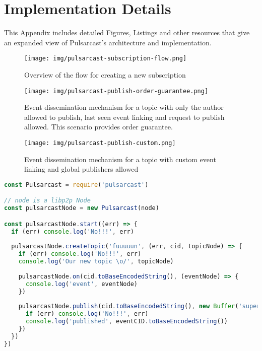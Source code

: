 
\section{Implementation Details}
\label{section:appendix}

This Appendix includes detailed Figures, Listings and other resources that give
an expanded view of Pulsarcast's architecture and implementation.

\begin{figure}
  \centering
  \texttt{[image: img/pulsarcast-subscription-flow.png]}
  \caption{Overview of the flow for creating a new subscription}
  \label{fig:pulsarcast-subscription-flow}
\end{figure}

\begin{figure}
  \centering
  \texttt{[image: img/pulsarcast-publish-order-guarantee.png]}
  \caption{Event dissemination mechanism for a topic with only the author allowed to publish, last seen event linking and request to publish allowed. This scenario provides order guarantee.}
  \label{fig:pulsarcast-publish-order-guarantee}
\end{figure}

\begin{figure}
  \centering
  \texttt{[image: img/pulsarcast-publish-custom.png]}
  \caption{Event dissemination mechanism for a topic with custom event linking and global publishers allowed}
  \label{fig:pulsarcast-publish-custom}
\end{figure}

\begin{lstlisting}[language=JavaScript, float=h, caption={Usage example of our Pulsarcast module},label={pulsarcast-usage-example}]
const Pulsarcast = require('pulsarcast')

// node is a libp2p Node
const pulsarcastNode = new Pulsarcast(node)

const pulsarcastNode.start((err) => {
  if (err) console.log('No!!!', err)
  
  pulsarcastNode.createTopic('fuuuuun', (err, cid, topicNode) => {
    if (err) console.log('No!!!', err)
    console.log('Our new topic \o/', topicNode)
    
    pulsarcastNode.on(cid.toBaseEncodedString(), (eventNode) => {
      console.log('event', eventNode)
    })
    
    pulsarcastNode.publish(cid.toBaseEncodedString(), new Buffer('super fun!'), (err, eventCID) => {
      if (err) console.log('No!!!', err)
      console.log('published', eventCID.toBaseEncodedString())
    })
  })
})
\end{lstlisting}

